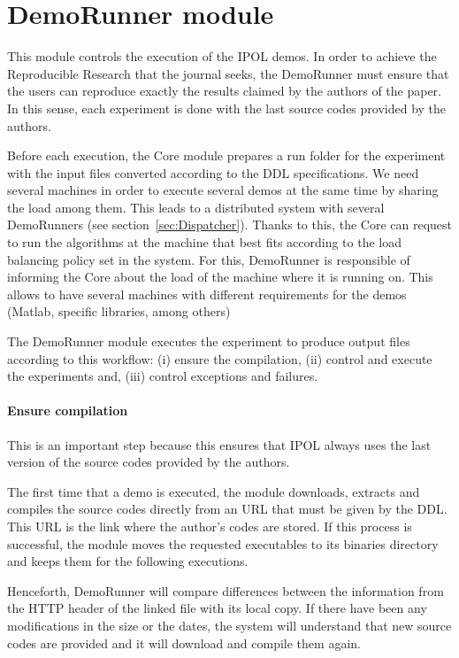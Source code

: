 \section{DemoRunner module}
\label{sec:DemoRunner}
This module controls the execution of the IPOL demos. In order to achieve the Reproducible Research that the journal seeks, the DemoRunner must ensure that the users can reproduce exactly the results claimed by the authors of the paper. In this sense, each experiment is done with the last source codes provided by the authors.

Before each execution, the Core module prepares a run folder for the experiment with the input files converted according to the DDL specifications. We need several machines in order to execute several demos at the same time by sharing the load among them. This leads to a distributed system with several DemoRunners (see section~\ref{sec:Dispatcher}). Thanks to this, the Core can request to run the algorithms at the machine that best fits according to the load balancing policy set in the system. For this, DemoRunner is responsible of informing the Core about the load of the machine where it is running on. This allows to have several machines with different requirements for the demos (Matlab, specific libraries, among others)

The DemoRunner module executes the experiment to produce output files according to this workflow: (i) ensure the compilation, (ii) control and execute the experiments and, (iii) control exceptions and failures. 

\paragraph{Ensure compilation}
\noindent

This is an important step because this ensures that IPOL always uses the last version of the source codes provided by the authors. 

The first time that a demo is executed, the module downloads, extracts and compiles the source codes directly from an URL that must be given by the DDL. This URL is the link where the author's codes are stored. If this process is successful, the module moves the requested executables to its binaries directory and keeps them for the following executions.

Henceforth, DemoRunner will compare differences between the information from the HTTP header of the linked file with its local copy. If there have been any modifications in the size or the dates, the system will understand that new source codes are provided and it will download and compile them again. 

